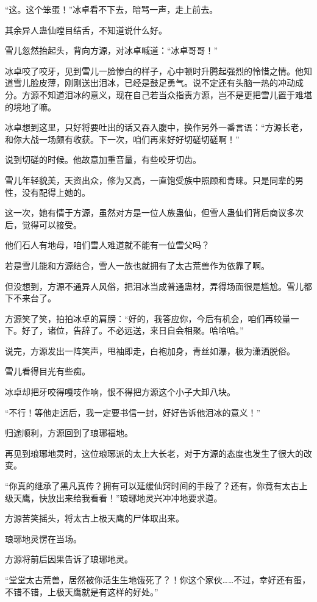 \begin{this_body}
“这。这个笨蛋！”冰卓看不下去，暗骂一声，走上前去。

其余异人蛊仙瞠目结舌，不知道说什么好。

雪儿忽然抬起头，背向方源，对冰卓喊道：“冰卓哥哥！”

冰卓咬了咬牙，见到雪儿一脸惨白的样子，心中顿时升腾起强烈的怜惜之情。他知道雪儿脸皮薄，刚刚送出泪冰，已经是鼓足勇气。说不定还有头脑一热的冲动成分。方源不知道泪冰的意义，现在自己若当众指责方源，岂不是更把雪儿置于难堪的境地了嘛。

冰卓想到这里，只好将要吐出的话又吞入腹中，换作另外一番言语：“方源长老，和你大战一场颇有收获。下一次，咱们再来好好切磋切磋啊！”

说到切磋的时候。他故意加重音量，有些咬牙切齿。

雪儿年轻貌美，天资出众，修为又高，一直饱受族中照顾和青睐。只是同辈的男性，没有配得上她的。

这一次，她有情于方源，虽然对方是一位人族蛊仙，但雪人蛊仙们背后商议多次后，觉得可以接受。

他们石人有地母，咱们雪人难道就不能有一位雪父吗？

若是雪儿能和方源结合，雪人一族也就拥有了太古荒兽作为依靠了啊。

但没想到，方源不通异人风俗，把泪冰当成普通蛊材，弄得场面很是尴尬。雪儿都下不来台了。

方源笑了笑，拍拍冰卓的肩膀：“好的，我答应你，今后有机会，咱们再较量一下。好了，诸位，告辞了。不必远送，来日自会相聚。哈哈哈。”

说完，方源发出一阵笑声，甩袖即走，白袍加身，青丝如瀑，极为潇洒脱俗。

雪儿看得目光有些痴。

冰卓却把牙咬得嘎吱作响，恨不得把方源这个小子大卸八块。

“不行！等他走远后，我一定要书信一封，好好告诉他泪冰的意义！”

归途顺利，方源回到了琅琊福地。

再见到琅琊地灵时，这位琅琊派的太上大长老，对于方源的态度也发生了很大的改变。

“你真的继承了黑凡真传？拥有可以延缓仙窍时间的手段了？还有，你竟有太古上级天鹰，快放出来给我看看！”琅琊地灵兴冲冲地要求道。

方源苦笑摇头，将太古上极天鹰的尸体取出来。

琅琊地灵愣在当场。

方源将前后因果告诉了琅琊地灵。

“堂堂太古荒兽，居然被你活生生地饿死了？！你这个家伙……不过，幸好还有蛋，不错不错，上极天鹰就是有这样的好处。”


\end{this_body}
